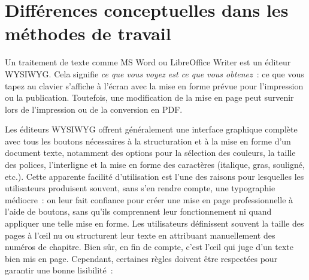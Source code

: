 \documentclass[11pt,a4paper,ngerman,french,DIV=8]{scrartcl}
\begin{document}
\section{Différences conceptuelles dans les méthodes de travail}\label{sec:arbeitsweise}

Un traitement de texte comme MS Word ou LibreOffice Writer est un éditeur WYSIWYG. Cela signifie \emph{ce que vous voyez est ce que vous obtenez} : ce que vous tapez au clavier s’affiche à l’écran avec la mise en forme prévue pour l’impression ou la publication. Toutefois, une modification de la mise en page peut survenir lors de l’impression ou de la conversion en PDF.

Les éditeurs WYSIWYG offrent généralement une interface graphique complète avec tous les boutons nécessaires à la structuration et à la mise en forme d'un document texte, notamment des options pour la sélection des couleurs, la taille des polices, l'interligne et la mise en forme des caractères (italique, gras, souligné, etc.). Cette apparente facilité d'utilisation est l'une des raisons pour lesquelles les utilisateurs produisent souvent, sans s'en rendre compte, une typographie médiocre : on leur fait confiance pour créer une mise en page professionnelle à l'aide de boutons, sans qu'ils comprennent leur fonctionnement ni quand appliquer une telle mise en forme. Les utilisateurs définissent souvent la taille des pages à l'œil nu ou structurent leur texte en attribuant manuellement des numéros de chapitre. Bien sûr, en fin de compte, c'est l'œil qui juge d'un texte bien mis en page. Cependant, certaines règles doivent être respectées pour garantir une bonne lisibilité :
\end{document}
